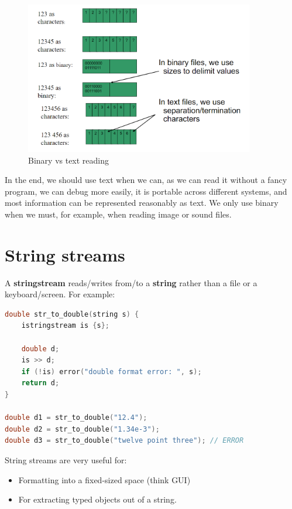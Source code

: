 \begin{figure}[H]
    \centering
    \includegraphics[width=10cm]{figures/binary_vs_text.png}
    \caption{Binary vs text reading}
    \label{fig:binary_vs_text}
\end{figure}

In the end, we should use text when we can, as we can read it without a fancy program, we can debug
more easily, it is portable across different systems, and most information can be represented 
reasonably as text. We only use binary when we must, for example, when reading image or sound files. 

\section{String streams}

A \textbf{stringstream} reads/writes from/to a \textbf{string} rather than a file or a 
keyboard/screen. For example:\\

\begin{lstlisting}[language=C++]
double str_to_double(string s) {
    istringstream is {s};

    double d;
    is >> d;
    if (!is) error("double format error: ", s);
    return d;
}

double d1 = str_to_double("12.4");
double d2 = str_to_double("1.34e-3");
double d3 = str_to_double("twelve point three"); // ERROR
\end{lstlisting}

String streams are very useful for:
\begin{itemize}
    \item Formatting into a fixed-sized space (think GUI)
    \item For extracting typed objects out of a string.
\end{itemize}

